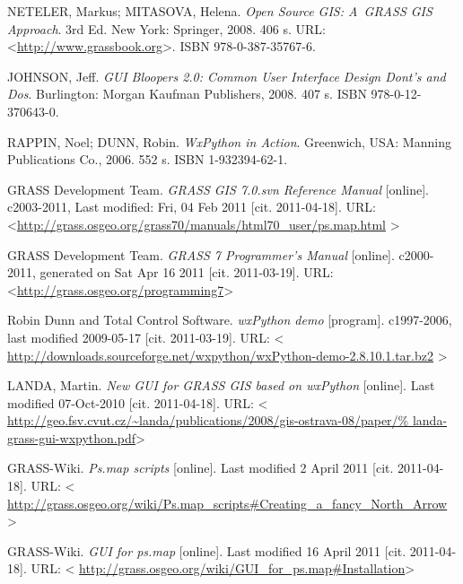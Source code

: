 \documentclass[a4paper,12pt,draft]{article}
\begin{document}
\newpage
\renewcommand{\refname}{Použité zdroje}
\addcontentsline{toc}{section}{\refname}
\begin{thebibliography}{99}
\label{literatura}


NETELER, Markus; MITASOVA, Helena. \textit{Open Source GIS:
A~GRASS GIS Approach}. 3rd Ed. New York: Springer, 2008. 406 s. URL:
\textless\url{http://www.grassbook.org}\textgreater. ISBN 978-0-387-35767-6.


JOHNSON, Jeff. \textit{GUI Bloopers 2.0: Common User Interface Design
Dont's and Dos}. Burlington: Morgan Kaufman Publishers, 2008. 407 s. ISBN
978-0-12-370643-0.


RAPPIN, Noel; DUNN, Robin. \emph{WxPython in Action}. Greenwich, USA: Manning
Publications Co., 2006. 552 s. ISBN 1-932394-62-1.


GRASS Development Team. \textit{GRASS GIS 7.0.svn Reference
Manual} [online]. c2003-2011, Last modified: Fri, 04 Feb 2011 [cit.
2011-04-18]. URL:
\textless\url{http://grass.osgeo.org/grass70/manuals/html70_user/ps.map.html}%
\textgreater


GRASS Development Team. \textit{GRASS 7 Programmer's Manual} [online].
c2000-2011, generated on Sat Apr 16 2011 [cit. 2011-03-19].
URL: \textless\url{http://grass.osgeo.org/programming7}\textgreater

Robin Dunn and Total Control Software. \textit{wxPython
demo} [program]. c1997-2006, last modified 2009-05-17 [cit. 2011-03-19]. URL:
\textless
\url{http://downloads.sourceforge.net/wxpython/wxPython-demo-2.8.10.1.tar.bz2}%
\textgreater


LANDA, Martin. \textit{New GUI for GRASS GIS based on wxPython} [online].
Last modified 07-Oct-2010 [cit. 2011-04-18]. URL: \textless
\url{http://geo.fsv.cvut.cz/~landa/publications/2008/gis-ostrava-08/paper/%
landa-grass-gui-wxpython.pdf}\textgreater


GRASS-Wiki. \textit{Ps.map scripts} [online]. Last modified
2 April 2011 [cit. 2011-04-18]. URL: \textless
\url{http://grass.osgeo.org/wiki/Ps.map_scripts\#Creating_a_fancy_North_Arrow}
\textgreater

GRASS-Wiki. \textit{GUI for ps.map} [online]. Last modified
16 April 2011 [cit. 2011-04-18]. URL: \textless
\url{http://grass.osgeo.org/wiki/GUI_for_ps.map\#Installation}\textgreater


\end{thebibliography}
\end{document}
